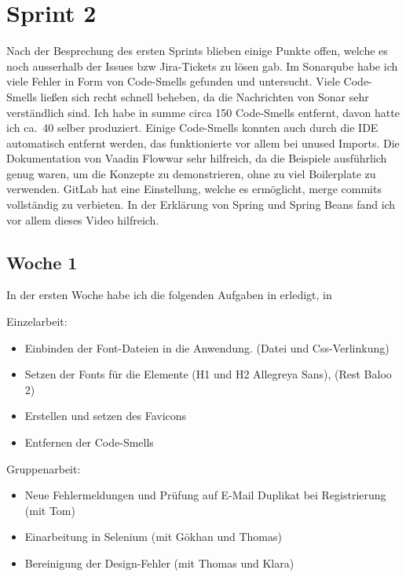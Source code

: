 

\section{Sprint 2}\label{sec:sprint2}
Nach der Besprechung des ersten Sprints blieben einige Punkte offen, welche es noch ausserhalb der Issues bzw Jira-Tickets zu lösen gab.
Im Sonarqube habe ich viele Fehler in Form von Code-Smells gefunden und untersucht.
Viele Code-Smells ließen sich recht schnell beheben, da die Nachrichten von Sonar sehr verständlich sind.
Ich habe in summe circa 150 Code-Smells entfernt, davon hatte ich ca.\ 40 selber produziert.
Einige Code-Smells konnten auch durch die IDE automatisch entfernt werden, das funktionierte vor allem bei unused Imports.
Die Dokumentation von Vaadin Flow\cite*[]{flowdocumentation}war sehr hilfreich, da die Beispiele ausführlich genug waren,
um die Konzepte zu demonstrieren, ohne zu viel Boilerplate zu verwenden.
GitLab hat eine Einstellung, welche es ermöglicht, merge commits vollständig zu verbieten.
In der Erklärung von Spring und Spring Beans fand ich vor allem dieses Video\cite*[]{springvideo} hilfreich.

\subsection{Woche 1}\label{subsec:s2w1}
In der ersten Woche habe ich die folgenden Aufgaben in erledigt, in

Einzelarbeit:
\begin{itemize}
    \item Einbinden der Font-Dateien in die Anwendung. (Datei und Css-Verlinkung)
    \item Setzen der Fonts für die Elemente (H1 und H2 Allegreya Sans), (Rest Baloo 2)
    \item Erstellen und setzen des Favicons
    \item Entfernen der Code-Smells

\end{itemize}

Gruppenarbeit:

\begin{itemize}
    \item Neue Fehlermeldungen und Prüfung auf E-Mail Duplikat bei Registrierung (mit Tom)
    \item Einarbeitung in Selenium (mit Gökhan und Thomas)
    \item Bereinigung der Design-Fehler (mit Thomas und Klara)
\end{itemize}
